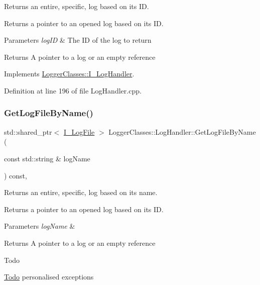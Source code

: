Returns an entire, specific, log based on its ID. 

Returns a pointer to an opened log based on its ID.


\begin{DoxyParams}{Parameters}
{\em log\+ID} & The ID of the log to return \\
\hline
\end{DoxyParams}
\begin{DoxyReturn}{Returns}
A pointer to a log or an empty reference 
\end{DoxyReturn}


Implements \mbox{\hyperlink{classLoggerClasses_1_1I__LogHandler_acbcae07a24a5f379a24e26a81c04189e}{Logger\+Classes\+::\+I\+\_\+\+Log\+Handler}}.



Definition at line 196 of file Log\+Handler.\+cpp.

\mbox{\label{classLoggerClasses_1_1LogHandler_ae6a51c1ec30e7aef116be8c906e8387f}} 
\subsubsection{\texorpdfstring{GetLogFileByName()}{GetLogFileByName()}}
{\footnotesize\ttfamily std\+::shared\+\_\+ptr$<$ \mbox{\hyperlink{classLoggerClasses_1_1I__LogFile}{I\+\_\+\+Log\+File}} $>$ Logger\+Classes\+::\+Log\+Handler\+::\+Get\+Log\+File\+By\+Name (\begin{DoxyParamCaption}\item[{const std\+::string \&}]{log\+Name }\end{DoxyParamCaption}) const\hspace{0.3cm}{\ttfamily [override]}, {\ttfamily [virtual]}}



Returns an entire, specific, log based on its name. 

Returns a pointer to an opened log based on its ID.


\begin{DoxyParams}{Parameters}
{\em log\+Name} & \\
\hline
\end{DoxyParams}
\begin{DoxyReturn}{Returns}
A pointer to a log or an empty reference 
\end{DoxyReturn}
\begin{DoxyRefDesc}{Todo}
\item[\mbox{\hyperlink{todo__todo000010}{Todo}}]personalised exceptions \end{DoxyRefDesc}


